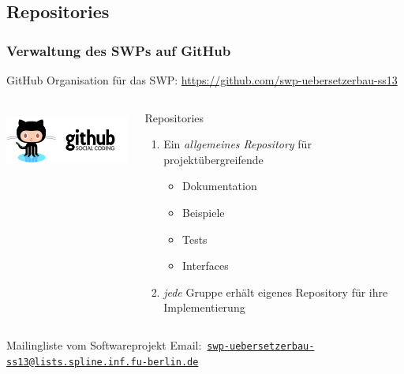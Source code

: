 \documentclass[ucs,9pt]{beamer}
\newcommand{\email}[1]{\href{mailto:#1}{\texttt{#1}}}
\begin{document}
\subsection{Repositories}
\begin{frame}
    \frametitle{Verwaltung des SWPs auf GitHub}
    GitHub Organisation für das SWP:
    \url{https://github.com/swp-uebersetzerbau-ss13}
  \begin{columns}
    \begin{column}{0.5\textwidth}
  \begin{center}
    \includegraphics[height=2cm]{githuboctacat}
  \end{center}
\end{column}
    \begin{column}{0.5\textwidth}
  \begin{block}{Repositories}
      \begin{enumerate}
          \item Ein \emph{allgemeines Repository} für projektübergreifende
              \begin{itemize}
                  \item Dokumentation
                  \item Beispiele
                  \item Tests
                  \item Interfaces
              \end{itemize}
          \item \emph{jede} Gruppe erhält eigenes Repository für ihre
              Implementierung
      \end{enumerate}
  \end{block}
\end{column}
  \end{columns}
  \begin{block}{Mailingliste vom Softwareprojekt}
      Email:~\email{swp-uebersetzerbau-ss13@lists.spline.inf.fu-berlin.de}
  \end{block}
\end{frame}
\end{document}
